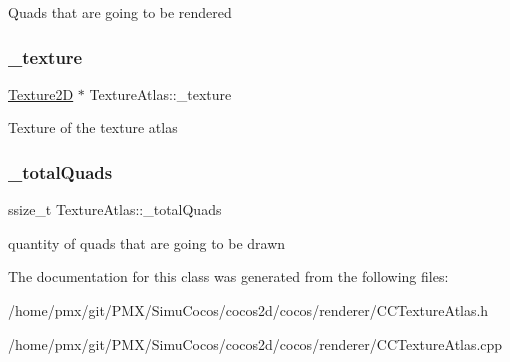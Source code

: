 Quads that are going to be rendered \mbox{\label{classTextureAtlas_adadaa6b0c4db68168819b743b30074a6}} 
\subsubsection{\texorpdfstring{\+\_\+texture}{\_texture}}
{\footnotesize\ttfamily \hyperlink{classTexture2D}{Texture2D} $\ast$ Texture\+Atlas\+::\+\_\+texture\hspace{0.3cm}{\ttfamily [protected]}}

Texture of the texture atlas \mbox{\label{classTextureAtlas_a57a013f57401888005ebbd4961f57d5b}} 
\subsubsection{\texorpdfstring{\+\_\+total\+Quads}{\_totalQuads}}
{\footnotesize\ttfamily ssize\+\_\+t Texture\+Atlas\+::\+\_\+total\+Quads\hspace{0.3cm}{\ttfamily [protected]}}

quantity of quads that are going to be drawn 

The documentation for this class was generated from the following files\+:\begin{DoxyCompactItemize}
\item 
/home/pmx/git/\+P\+M\+X/\+Simu\+Cocos/cocos2d/cocos/renderer/C\+C\+Texture\+Atlas.\+h\item 
/home/pmx/git/\+P\+M\+X/\+Simu\+Cocos/cocos2d/cocos/renderer/C\+C\+Texture\+Atlas.\+cpp\end{DoxyCompactItemize}
